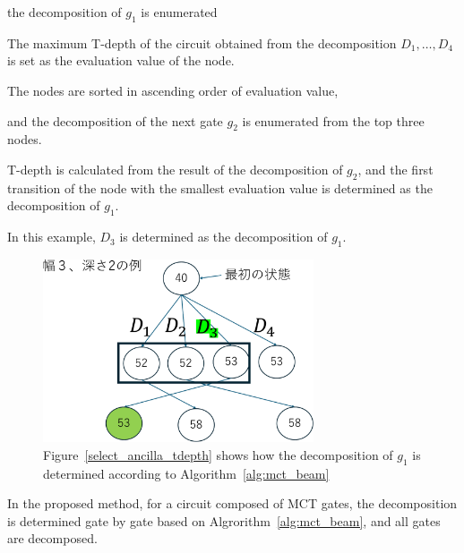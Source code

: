 the decomposition of $g_{1}$ is enumerated 

The maximum T-depth of the circuit obtained from the decomposition $D_{1},\dots,D_{4}$ is set as the evaluation value of the node.

The nodes are sorted in ascending order of evaluation value,

and the decomposition of the next gate $g_{2}$ is enumerated from the top three nodes.

T-depth is calculated from the result of the decomposition of $g_{2}$,
and the first transition of the node with the smallest evaluation value is determined as the decomposition of $g_{1}$.

In this example, $D_{3}$ is determined as the decomposition of $g_{1}$.

\begin{figure}[tbp]

\centering

\includegraphics[width=8cm]{img/mct_beam.pdf}

\caption{Figure~\ref{select_ancilla_tdepth} shows how the decomposition of $g_{1}$ is determined according to Algorithm~\ref{alg:mct_beam}}

\label{mct_beam}

\end{figure}

In the proposed method, for a circuit composed of MCT gates, the decomposition is determined gate by gate
based on Algrorithm~\ref{alg:mct_beam}, and all gates are decomposed.


